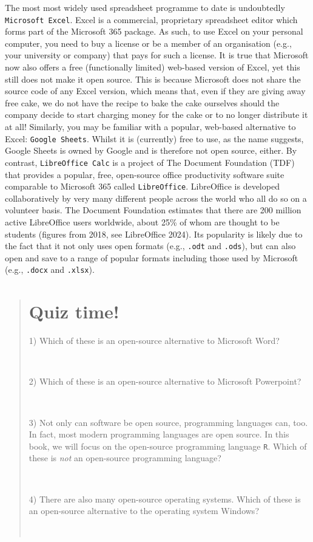 \documentclass[
  letterpaper,
  DIV=11,
  numbers=noendperiod,
  oneside]{scrreprt}
\begin{document}
The most most widely used spreadsheet programme to date is undoubtedly
\texttt{Microsoft\ Excel}. Excel is a commercial, proprietary
spreadsheet editor which forms part of the Microsoft 365 package. As
such, to use Excel on your personal computer, you need to buy a license
or be a member of an organisation (e.g., your university or company)
that pays for such a license. It is true that Microsoft now also offers
a free (functionally limited) web-based version of Excel, yet this still
does not make it open source. This is because Microsoft does not share
the source code of any Excel version, which means that, even if they are
giving away free cake, we do not have the recipe to bake the cake
ourselves should the company decide to start charging money for the cake
or to no longer distribute it at all! Similarly, you may be familiar
with a popular, web-based alternative to Excel: \texttt{Google\ Sheets}.
Whilst it is (currently) free to use, as the name suggests, Google
Sheets is owned by Google and is therefore not open source, either. By
contrast, \texttt{LibreOffice\ Calc} is a project of The Document
Foundation (TDF) that provides a popular, free, open-source office
productivity software suite comparable to Microsoft 365 called
\texttt{LibreOffice}. LibreOffice is developed collaboratively by very
many different people across the world who all do so on a volunteer
basis. The Document Foundation estimates that there are 200 million
active LibreOffice users worldwide, about 25\% of whom are thought to be
students (figures from 2018, see LibreOffice 2024). Its popularity is
likely due to the fact that it not only uses open formats (e.g.,
\texttt{.odt} and \texttt{.ods}), but can also open and save to a range
of popular formats including those used by Microsoft (e.g.,
\texttt{.docx} and \texttt{.xlsx}).

\begin{quote}
\section*{Quiz time!}\label{quiz-time}


1) Which of these is an open-source alternative to Microsoft Word?

~

2) Which of these is an open-source alternative to Microsoft Powerpoint?

~

3) Not only can software be open source, programming languages can, too.
In fact, most modern programming languages are open source. In this
book, we will focus on the open-source programming language \texttt{R}.
Which of these is \emph{not} an open-source programming language?

~

4) There are also many open-source operating systems. Which of these is
an open-source alternative to the operating system Windows?

~
\end{quote}
\end{document}
